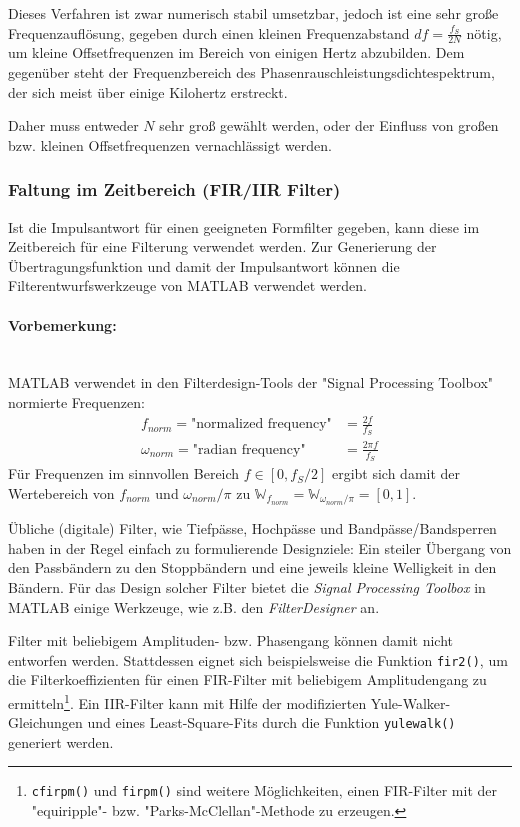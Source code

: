 Dieses Verfahren ist zwar numerisch stabil umsetzbar, jedoch ist eine sehr große Frequenzauflösung, gegeben durch einen kleinen Frequenzabstand $df=\frac{f_S}{2 N}$ nötig, um kleine Offsetfrequenzen im Bereich von einigen Hertz abzubilden. Dem gegenüber steht der Frequenzbereich des Phasenrauschleistungsdichtespektrum, der sich meist über einige Kilohertz erstreckt. 

Daher muss entweder $N$ sehr groß gewählt werden, oder der Einfluss von großen bzw. kleinen Offsetfrequenzen vernachlässigt werden.

\subsubsection{Faltung im Zeitbereich (FIR/IIR Filter)}
Ist die Impulsantwort für einen geeigneten Formfilter gegeben, kann diese im Zeitbereich für eine Filterung verwendet werden. Zur Generierung der Übertragungsfunktion und damit der Impulsantwort können die Filterentwurfswerkzeuge von MATLAB verwendet werden.

\paragraph{Vorbemerkung:}\mbox{}\\
MATLAB verwendet in den Filterdesign-Tools der "Signal Processing Toolbox" normierte Frequenzen:
\begin{subequations}
	\begin{align}
	f_{norm} = \text{"normalized frequency"} &= \frac{2f}{f_S} \\
	\omega_{norm} = \text{"radian frequency"} &= \frac{2\pi f}{f_S}
	\end{align}
\end{subequations}
Für Frequenzen im sinnvollen Bereich $f\in [0,f_S/2]$ ergibt sich damit der Wertebereich von
$f_{norm}$ und $\omega_{norm}/\pi$ zu $\mathbb{W}_{f_{norm}}=\mathbb{W}_{\omega_{norm}/\pi}=[0,1]$.

\vspace{10ex}


Übliche (digitale) Filter, wie Tiefpässe, Hochpässe und Bandpässe/Bandsperren haben in der Regel einfach zu formulierende Designziele: Ein steiler Übergang von den Passbändern zu den Stoppbändern und eine jeweils kleine Welligkeit in den Bändern.
Für das Design solcher Filter bietet die \textit{Signal Processing Toolbox} in MATLAB einige Werkzeuge, wie z.B. den \textit{FilterDesigner} an.

Filter mit beliebigem Amplituden- bzw. Phasengang können damit nicht entworfen werden. Stattdessen eignet sich beispielsweise die Funktion \texttt{fir2()}, um die Filterkoeffizienten für einen FIR-Filter mit beliebigem Amplitudengang zu ermitteln\footnote{\texttt{cfirpm()} und \texttt{firpm()} sind weitere Möglichkeiten, einen FIR-Filter mit der "equiripple"- bzw. "Parks-McClellan"-Methode zu erzeugen.}. Ein IIR-Filter kann mit Hilfe der modifizierten Yule-Walker-Gleichungen und eines Least-Square-Fits durch die Funktion \texttt{yulewalk()} generiert werden.

